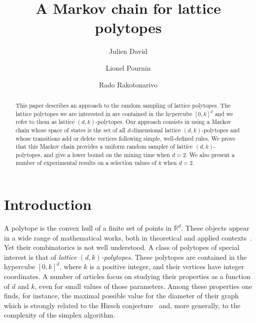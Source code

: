 \documentclass[a4paper]{article}
\begin{document}
\title{A Markov chain for lattice polytopes}
\author[1]{Julien David}
\author[1]{Lionel Pournin}
\author[1]{Rado Rakotonarivo}
\date{}
\maketitle

\begin{abstract}
This paper describes an approach to the random sampling of lattice polytopes. The lattice polytopes we are interested in are contained in the hypercube $[0,k]^d$ and we refer to them as lattice $(d,k)$-polytopes. Our approach consists in using a Markov chain whose space of states is the set of all $d$-dimensional lattice $(d,k)$-polytopes and whose transitions add or delete vertices following simple, well-defined rules. We prove that this Markov chain provides a uniform random sampler of lattice $(d, k)$-polytopes, and give a lower bound on the mixing time when $d=2$. We also present a number of experimental results on a selection values of $k$ when $d=2$.
\end{abstract}

\section{Introduction}

A polytope is the convex hull of a finite set of points in $\mathbb{R}^d$. These objects appear in a wide range of mathematical works, both in theoretical and applied contexts~\cite{ziegler1995lectures}. Yet their combinatorics is not well understood. A class of polytopes of special interest is that of \emph{lattice $(d,k)$-polytopes}. These polytopes are contained in the hypercube $[0,k]^d$, where $k$ is a positive integer, and their vertices have integer coordinates. A number of articles focus on studying their properties as a function of $d$ and $k$, even for small values of those parameters. Among these properties one finds, for instance, the maximal possible value for the diameter of their graph~\cite{DelPiaMichini2016,DezaManoussakisOnn2018,DezaPournin2018,KleinschmidtOnn1992,Naddef1989} which is strongly related to the Hirsch conjecture~\cite{BonifasDiSummaEisenbrandHahnleNiemeier2014,BorgwardtDeLoeraFinhold2016,KalaiKleitman1992,KleeWalkup1967,Santos2012} and, more generally, to the complexity of the simplex algorithm.
\end{document}

